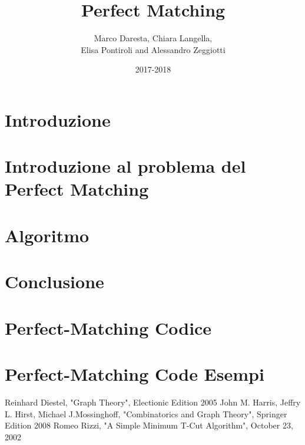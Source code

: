 \documentclass[12pt,a4paper,oneside,titlepage]{report}
\theoremstyle{plain}
\theoremstyle{definition}
\theoremstyle{remark}
\begin{document}
\title{\textbf{Perfect Matching}} 
\author{Marco Daresta, Chiara Langella, \\ Elisa Pontiroli and Alessandro Zeggiotti }
\date{2017-2018}
\maketitle
\chapter*{Introduzione}

\tableofcontents
\chapter{Introduzione al problema del Perfect Matching}

\chapter{Algoritmo}

\chapter{Conclusione}


\appendix
\chapter{Perfect-Matching Codice}

\chapter{Perfect-Matching Code Esempi}


\begin{thebibliography}{90}        
 Reinhard Diestel, "Graph Theory", Electionic Edition 2005
 John M. Harris, Jeffry L. Hirst, Michael J.Mossinghoff, "Combinatorics and Graph Theory", Springer Edition 2008
 Romeo Rizzi, "A Simple Minimum T-Cut Algorithm", October 23, 2002
\end{thebibliography}
\end{document}
